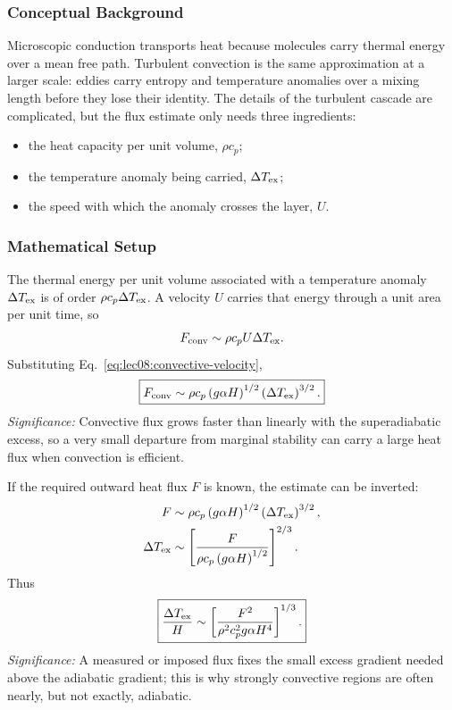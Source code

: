 \subsubsection*{Conceptual Background}
Microscopic conduction transports heat because molecules carry thermal energy
over a mean free path. Turbulent convection is the same approximation at a
larger scale: eddies carry entropy and temperature anomalies over a mixing
length before they lose their identity. The details of the turbulent cascade
are complicated, but the flux estimate only needs three ingredients:
\begin{itemize}
    \item the heat capacity per unit volume, $\rho c_p$;
    \item the temperature anomaly being carried, $\Delta T_{\rm ex}$;
    \item the speed with which the anomaly crosses the layer, $U$.
\end{itemize}

\subsubsection*{Mathematical Setup}
The thermal energy per unit volume associated with a temperature anomaly
$\Delta T_{\rm ex}$ is of order $\rho c_p\Delta T_{\rm ex}$. A velocity $U$
carries that energy through a unit area per unit time, so
\begin{equation}
    F_{\rm conv}
    \sim
    \rho c_p U\Delta T_{\rm ex}.
    \label{eq:lec08:convective-flux-basic}
\end{equation}
Substituting Eq.~\eqref{eq:lec08:convective-velocity},
\begin{equation}
    \boxed{
    F_{\rm conv}
    \sim
    \rho c_p
    \left(g\alpha H\right)^{1/2}
    \left(\Delta T_{\rm ex}\right)^{3/2}.
    }
    \label{eq:lec08:convective-flux}
\end{equation}
\textit{Significance:} Convective flux grows faster than linearly with the
superadiabatic excess, so a very small departure from marginal stability can
carry a large heat flux when convection is efficient.

If the required outward heat flux $F$ is known, the estimate can be inverted:
\begin{align}
    F
    &\sim
    \rho c_p
    \left(g\alpha H\right)^{1/2}
    \left(\Delta T_{\rm ex}\right)^{3/2},
    \label{eq:lec08:flux-inversion-step}\\
    \Delta T_{\rm ex}
    &\sim
    \left[
        \frac{F}{\rho c_p\left(g\alpha H\right)^{1/2}}
    \right]^{2/3}.
    \label{eq:lec08:superadiabatic-excess-from-flux}
\end{align}
Thus
\begin{equation}
    \boxed{
    \frac{\Delta T_{\rm ex}}{H}
    \sim
    \left[
        \frac{F^2}{\rho^2c_p^2g\alpha H^4}
    \right]^{1/3}.
    }
    \label{eq:lec08:superadiabatic-gradient-from-flux}
\end{equation}
\textit{Significance:} A measured or imposed flux fixes the small excess
gradient needed above the adiabatic gradient; this is why strongly convective
regions are often nearly, but not exactly, adiabatic.

